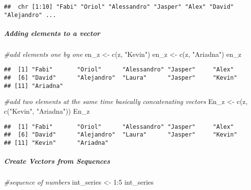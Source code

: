 \documentclass[
]{article}
\newenvironment{Shaded}{\begin{snugshade}}{\end{snugshade}}
\newcommand{\CommentTok}[1]{\textcolor[rgb]{0.56,0.35,0.01}{\textit{#1}}}
\newcommand{\DecValTok}[1]{\textcolor[rgb]{0.00,0.00,0.81}{#1}}
\newcommand{\FunctionTok}[1]{\textcolor[rgb]{0.00,0.00,0.00}{#1}}
\newcommand{\NormalTok}[1]{#1}
\newcommand{\OtherTok}[1]{\textcolor[rgb]{0.56,0.35,0.01}{#1}}
\newcommand{\SpecialCharTok}[1]{\textcolor[rgb]{0.00,0.00,0.00}{#1}}
\newcommand{\StringTok}[1]{\textcolor[rgb]{0.31,0.60,0.02}{#1}}
\begin{document}
\begin{verbatim}
##  chr [1:10] "Fabi" "Oriol" "Alessandro" "Jasper" "Alex" "David" "Alejandro" ...
\end{verbatim}

\hypertarget{adding-elements-to-a-vector}{%
\subparagraph{Adding elements to a
vector}\label{adding-elements-to-a-vector}}

\begin{Shaded}
\begin{Highlighting}[]
\CommentTok{\#add elements one by one}
\NormalTok{en\_z }\OtherTok{\textless{}{-}} \FunctionTok{c}\NormalTok{(z, }\StringTok{"Kevin"}\NormalTok{)}
\NormalTok{en\_z }\OtherTok{\textless{}{-}} \FunctionTok{c}\NormalTok{(z, }\StringTok{"Ariadna"}\NormalTok{)}
\NormalTok{en\_z}
\end{Highlighting}
\end{Shaded}

\begin{verbatim}
##  [1] "Fabi"       "Oriol"      "Alessandro" "Jasper"     "Alex"      
##  [6] "David"      "Alejandro"  "Laura"      "Jasper"     "Kevin"     
## [11] "Ariadna"
\end{verbatim}

\begin{Shaded}
\begin{Highlighting}[]
\CommentTok{\#add two elements at the same time basically concatenating vectors}
\NormalTok{En\_z }\OtherTok{\textless{}{-}} \FunctionTok{c}\NormalTok{(z, }\FunctionTok{c}\NormalTok{(}\StringTok{"Kevin"}\NormalTok{, }\StringTok{"Ariadna"}\NormalTok{))}
\NormalTok{En\_z}
\end{Highlighting}
\end{Shaded}

\begin{verbatim}
##  [1] "Fabi"       "Oriol"      "Alessandro" "Jasper"     "Alex"      
##  [6] "David"      "Alejandro"  "Laura"      "Jasper"     "Kevin"     
## [11] "Kevin"      "Ariadna"
\end{verbatim}

\hypertarget{create-vectors-from-sequences}{%
\subparagraph{Create Vectors from
Sequences}\label{create-vectors-from-sequences}}

\begin{Shaded}
\begin{Highlighting}[]
\CommentTok{\#sequence of numbers}
\NormalTok{int\_series }\OtherTok{\textless{}{-}} \DecValTok{1}\SpecialCharTok{:}\DecValTok{5}
\NormalTok{int\_series}
\end{Highlighting}
\end{Shaded}
\end{document}
